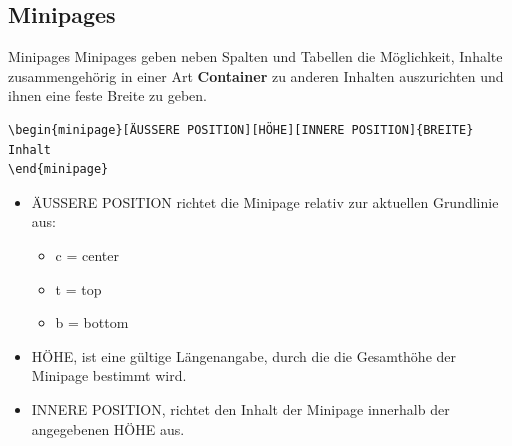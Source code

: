 

%
%


\subsection{Minipages}
\begin{frame}[fragile]{Minipages}
Minipages geben neben Spalten und Tabellen die Möglichkeit, Inhalte zusammengehörig in einer Art \textbf{Container} zu anderen Inhalten auszurichten und ihnen eine feste Breite zu geben.
\begin{lstlisting}[style=tex]
\begin{minipage}[ÄUSSERE POSITION][HÖHE][INNERE POSITION]{BREITE}
Inhalt
\end{minipage}\end{lstlisting}
\begin{itemize}
\item ÄUSSERE POSITION richtet die Minipage relativ zur aktuellen Grundlinie aus:
\begin{itemize}
\item c = center
\item t = top
\item b = bottom \newline
\end{itemize}
\item HÖHE, ist eine gültige Längenangabe, durch die die Gesamthöhe der Minipage bestimmt wird. \newline
\item INNERE POSITION, richtet den Inhalt der Minipage innerhalb der angegebenen HÖHE aus.
\end{itemize}
\end{frame}

